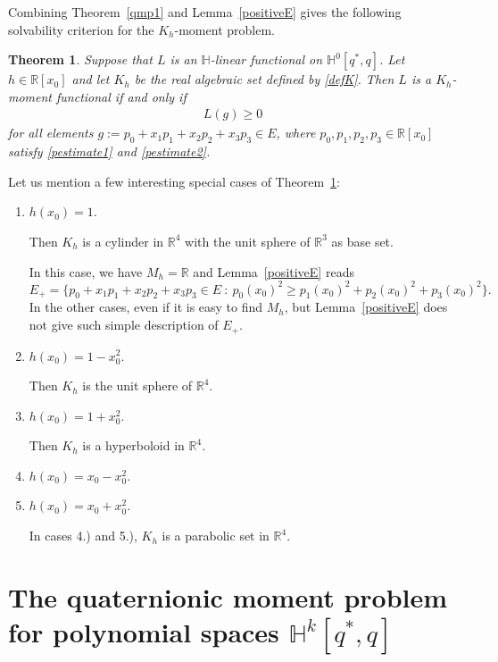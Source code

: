 \documentclass[11pt,a4paper]{amsart}
\newtheorem{theorem}{Theorem}[section]
\theoremstyle{definition}
\begin{document}
Combining Theorem~\ref{qmp1} and Lemma~\ref{positiveE} gives the following
solvability criterion for the $K_{h}$-moment problem.

\begin{theorem}%
\label{mpK_h}
Suppose that $L$ is an $\mathbb{H}$-linear functional on
$\mathbb{H}^{0}[q^{*},q]$. Let $h\in \mathbb{R}[x_{0}]$ and let
$K_{h}$ be the real algebraic set defined by \eqref{defK}. Then $L$ is
a $K_{h}$-moment functional if and only if
%
\begin{align}
L(g)\geq 0
\label{eq62}
\end{align}
%
for all elements $g:=p_{0}+x_{1}p_{1}+x_{2}p_{2}+x_{3}p_{3}\in E$, where
$p_{0},p_{1},p_{2},p_{3}\in \mathbb{R}[x_{0}]$ satisfy \eqref{pestimate1} and \eqref{pestimate2}.
\end{theorem}

Let us mention a few interesting special cases of Theorem~\ref{mpK_h}:
%
\begin{enumerate}
%
\item[1.)] $h(x_{0})=1$.%

Then $K_{h}$ is a cylinder in $\mathbb{R}^{4}$ with the unit sphere of
$\mathbb{R}^{3}$ as base set.%

In this case, we have $M_{h}=\mathbb{R}$ and Lemma~\ref{positiveE} reads
%
\begin{equation*}
E_{+}= \{ p_{0}+x_{1}p_{1}+x_{2}p_{2}+x_{3}p_{3}\in E \ : \: p_{0}(x_{0})^{2}
\ge p_{1}(x_{0})^{2}+p_{2}(x_{0})^{2}+p_{3}(x_{0})^{2}\}.
\end{equation*}
%
In the other cases, even if it is easy to find $M_{h}$, but Lemma~\ref{positiveE} does not give such simple description of $E_{+}$.
%
\item[2.)] $h(x_{0})=1-x_{0}^{2}$.


Then $K_{h}$ is the unit sphere of $\mathbb{R}^{4}$.
%
\item[3.)] $h(x_{0})=1+x_{0}^{2}$.%

Then $K_{h}$ is a hyperboloid in $\mathbb{R}^{4}$.
%
\item[4.)] $h(x_{0})=x_{0}-x_{0}^{2}$.
%
\item[5.)] $h(x_{0})=x_{0}+x_{0}^{2}$.%

In cases 4.) and 5.), $K_{h}$ is a parabolic set in $\mathbb{R}^{4}$.
%
\end{enumerate}

\section{The quaternionic moment problem for polynomial spaces $ \mathbb{H}^{k}[q^{*}, q]$}
\label{mphk}
\end{document}
